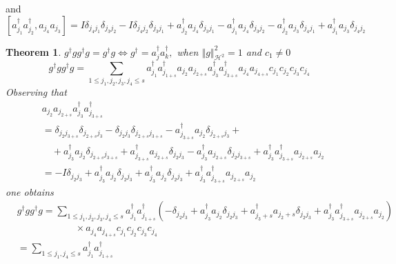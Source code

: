 \documentclass[aps,preprint]{revtex4}%
\newtheorem{theorem}{Theorem}
\begin{document}
and
\begin{equation}
\left[  a_{j_{1}}^{\dagger}a_{j_{2}}^{\dagger},a_{j_{4}}a_{j_{3}}\right]
=I\delta_{j_{4}j_{1}}\delta_{j_{3}j_{2}}-I\delta_{j_{4}j_{2}}\delta
_{j_{3}j_{1}}+a_{j_{2}}^{\dagger}a_{j_{4}}\delta_{j_{3}j_{1}}-a_{j_{1}%
}^{\dagger}a_{j_{4}}\delta_{j_{3}j_{2}}-a_{j_{2}}^{\dagger}a_{j_{3}}%
\delta_{j_{4}j_{1}}+a_{j_{1}}^{\dagger}a_{j_{3}}\delta_{j_{4}j_{2}}%
\end{equation}


\begin{theorem}
\bigskip$g^{\dagger}gg^{\dagger}g=g^{\dagger}g\Longleftrightarrow g^{\dagger
}=a_{j}^{\dagger}a_{k}^{\dagger},$ when $\left\Vert g\right\Vert
_{\mathcal{H}^{2}}^{2}=1$ and $c_{1}\neq0$%
\begin{equation}
g^{\dagger}gg^{\dagger}g=\sum_{1\leq j_{1},j_{2},j_{3},j_{4}\leq s}a_{j_{1}%
}^{\dagger}a_{j_{1+s}}^{\dagger}a_{j_{2}}a_{j_{2+s}}a_{j_{3}}^{\dagger
}a_{j_{3+s}}^{\dagger}a_{j_{4}}a_{j_{4+s}}c_{j_{1}}c_{j_{2}}c_{j_{3}}c_{j_{4}}%
\end{equation}
Observing that
\begin{align}
&  a_{j_{2}}a_{j_{2+s}}a_{j_{3}}^{\dagger}a_{j_{3+s}}^{\dagger}\nonumber\\
&  =\delta_{j_{2}j_{3+s}}\delta_{j_{2+s}j_{3}}-\delta_{j_{2}j_{3}}%
\delta_{j_{2+s}j_{3+s}}-a_{j_{3+s}}^{\dagger}a_{j_{2}}\delta_{j_{2+s}j_{3}%
}+\nonumber\\
&  \quad+a_{j_{3}}^{\dagger}a_{j_{2}}\delta_{j_{2+s}j_{3+s}}+a_{j_{3+s}%
}^{\dagger}a_{j_{2+s}}\delta_{j_{2}j_{3}}-a_{j_{3}}^{\dagger}a_{j_{2+s}}%
\delta_{j_{2}j_{3+s}}+a_{j_{3}}^{\dagger}a_{j_{3+s}}^{\dagger}a_{j_{2+s}%
}a_{j_{2}}\nonumber\\
&  =-I\delta_{j_{2}j_{3}}+a_{j_{3}}^{\dagger}a_{j_{2}}\delta_{j_{2}j_{3}%
}+a_{j_{3}}^{\dagger}a_{j_{2}}\delta_{j_{2}j_{3}}+a_{j_{3}}^{\dagger
}a_{j_{3+s}}^{\dagger}a_{j_{2+s}}a_{j_{2}}%
\end{align}
one obtains%
\begin{align}
&  g^{\dagger}gg^{\dagger}g=\sum_{1\leq j_{1},j_{2},j_{3},j_{4}\leq s}%
a_{j_{1}}^{\dagger}a_{j_{1+s}}^{\dagger}\left(  -\delta_{j_{2}j_{3}}+a_{j_{3}%
}^{\dagger}a_{j_{2}}\delta_{j_{2}j_{3}}+a_{j_{3}+s}^{\dagger}a_{j_{2}+s}%
\delta_{j_{2}j_{3}}+a_{j_{3}}^{\dagger}a_{j_{3+s}}^{\dagger}a_{j_{2+s}%
}a_{j_{2}}\right) \nonumber\\
&  \qquad\qquad\qquad\times a_{j_{4}}a_{j_{4+s}}c_{j_{1}}c_{j_{2}}c_{j_{3}%
}c_{j_{4}}\nonumber\\
&  =\sum_{1\leq j_{1},j_{4}\leq s}a_{j_{1}}^{\dagger}a_{j_{1+s}}^{\dagger
}
\end{align}
\end{theorem}
\end{document}
